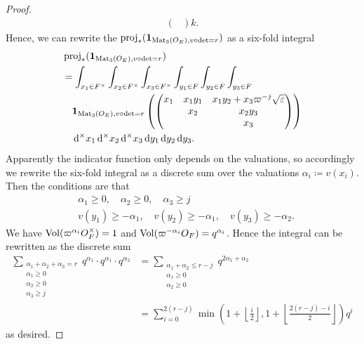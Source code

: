 \begin{proof}
\begin{align*}
\begin{pmatrix}
    \end{pmatrix}
    k.
  \end{align*}
  Hence, we can rewrite the $\operatorname{proj}_\ast(\mathbf{1}_{\operatorname{Mat}_3(O_E), v\circ\det=r})$
  as a six-fold integral
  \begin{align*}
    &\rproj_\ast(\mathbf{1}_{\Mat_3(\OO_E), v\circ\det=r}) \\
    &= \int_{x_1 \in F^\times} \int_{x_2 \in F^\times} \int_{x_3 \in F^\times}
    \int_{y_1 \in F} \int_{y_2 \in F} \int_{y_3 \in F} \\
    &\quad \mathbf{1}_{\Mat_3(\OO_E), v\circ\det=r} \left(
    \begin{pmatrix}
      x_1 & x_1 y_1 & x_1 y_2 + x_3 \varpi^{-j} \sqrt\eps \\
      & x_2 & x_2 y_3 \\
      & & x_3
    \end{pmatrix}
    \right) \\
    &\quad \odif[{\times,\times,\times}]{x_1,x_2,x_3,y_1,y_2,y_3}.
  \end{align*}
  Apparently the indicator function only depends on the valuations,
  so accordingly we rewrite the six-fold integral as a discrete sum over the valuations
  $\alpha_i \coloneqq v(x_i)$.
  Then the conditions are that
  \begin{align*}
    &\alpha_1 \ge 0, \quad \alpha_2 \ge 0, \quad \alpha_3 \ge j \\
    &v(y_1) \ge - \alpha_1, \quad v(y_2) \ge - \alpha_1, \quad v(y_3) \ge -\alpha_2.
  \end{align*}
  We have $\operatorname{Vol}(\varpi^{\alpha_i} O_F^\times) = 1$
  and $\operatorname{Vol}(\varpi^{-\alpha_i} O_F) = q^{\alpha_i}$.
  Hence the integral can be rewritten as the discrete sum
  \begin{align*}
    \sum_{\substack{\alpha_1 + \alpha_2 + \alpha_3 = r \\ \alpha_1 \ge 0 \\ \alpha_2 \ge 0 \\ \alpha_3 \ge j}}
    q^{\alpha_1} \cdot q^{\alpha_1} \cdot q^{\alpha_2}
    &= \sum_{\substack{\alpha_1 + \alpha_2 \le r-j \\ \alpha_1 \ge 0 \\ \alpha_2 \ge 0}}
    q^{2\alpha_1+\alpha_2} \\
    &= \sum_{i=0}^{2(r-j)}
    \min \left( 1 + \left\lfloor \frac i2 \right\rfloor,
      1 + \left\lfloor \frac{2(r-j)-i}{2} \right\rfloor
    \right) q^i
  \end{align*}
  as desired.
\end{proof}

